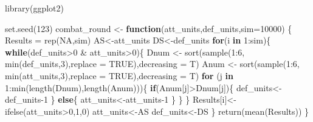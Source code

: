 \documentclass[
]{article}
\newenvironment{Shaded}{\begin{snugshade}}{\end{snugshade}}
\newcommand{\AttributeTok}[1]{\textcolor[rgb]{0.77,0.63,0.00}{#1}}
\newcommand{\ConstantTok}[1]{\textcolor[rgb]{0.00,0.00,0.00}{#1}}
\newcommand{\ControlFlowTok}[1]{\textcolor[rgb]{0.13,0.29,0.53}{\textbf{#1}}}
\newcommand{\DecValTok}[1]{\textcolor[rgb]{0.00,0.00,0.81}{#1}}
\newcommand{\FunctionTok}[1]{\textcolor[rgb]{0.00,0.00,0.00}{#1}}
\newcommand{\NormalTok}[1]{#1}
\newcommand{\OtherTok}[1]{\textcolor[rgb]{0.56,0.35,0.01}{#1}}
\newcommand{\SpecialCharTok}[1]{\textcolor[rgb]{0.00,0.00,0.00}{#1}}
\begin{document}
\begin{Shaded}
\begin{Highlighting}[]
\FunctionTok{library}\NormalTok{(ggplot2)}

\FunctionTok{set.seed}\NormalTok{(}\DecValTok{123}\NormalTok{)}
\NormalTok{combat\_round }\OtherTok{\textless{}{-}} \ControlFlowTok{function}\NormalTok{(att\_units,def\_units,}\AttributeTok{sim=}\DecValTok{10000}\NormalTok{) \{}
\NormalTok{  Results }\OtherTok{=} \FunctionTok{rep}\NormalTok{(}\ConstantTok{NA}\NormalTok{,sim)}
\NormalTok{  AS}\OtherTok{\textless{}{-}}\NormalTok{att\_units}
\NormalTok{  DS}\OtherTok{\textless{}{-}}\NormalTok{def\_units}
  \ControlFlowTok{for}\NormalTok{(i }\ControlFlowTok{in} \DecValTok{1}\SpecialCharTok{:}\NormalTok{sim)\{}
    \ControlFlowTok{while}\NormalTok{(def\_units}\SpecialCharTok{\textgreater{}}\DecValTok{0} \SpecialCharTok{\&}\NormalTok{ att\_units}\SpecialCharTok{\textgreater{}}\DecValTok{0}\NormalTok{)\{}
\NormalTok{      Dnum }\OtherTok{\textless{}{-}} \FunctionTok{sort}\NormalTok{(}\FunctionTok{sample}\NormalTok{(}\DecValTok{1}\SpecialCharTok{:}\DecValTok{6}\NormalTok{, }\FunctionTok{min}\NormalTok{(def\_units,}\DecValTok{3}\NormalTok{),}\AttributeTok{replace =} \ConstantTok{TRUE}\NormalTok{),}\AttributeTok{decreasing =}\NormalTok{ T)}
\NormalTok{      Anum }\OtherTok{\textless{}{-}} \FunctionTok{sort}\NormalTok{(}\FunctionTok{sample}\NormalTok{(}\DecValTok{1}\SpecialCharTok{:}\DecValTok{6}\NormalTok{, }\FunctionTok{min}\NormalTok{(att\_units,}\DecValTok{3}\NormalTok{),}\AttributeTok{replace =} \ConstantTok{TRUE}\NormalTok{),}\AttributeTok{decreasing =}\NormalTok{ T)}
      \ControlFlowTok{for}\NormalTok{ (j }\ControlFlowTok{in} \DecValTok{1}\SpecialCharTok{:}\FunctionTok{min}\NormalTok{(}\FunctionTok{length}\NormalTok{(Dnum),}\FunctionTok{length}\NormalTok{(Anum)))\{}
        \ControlFlowTok{if}\NormalTok{(Anum[j]}\SpecialCharTok{\textgreater{}}\NormalTok{Dnum[j])\{}
\NormalTok{          def\_units}\OtherTok{\textless{}{-}}\NormalTok{def\_units}\DecValTok{{-}1}
\NormalTok{        \}}
        \ControlFlowTok{else}\NormalTok{\{}
\NormalTok{          att\_units}\OtherTok{\textless{}{-}}\NormalTok{att\_units}\DecValTok{{-}1}
\NormalTok{        \}}
\NormalTok{      \}}
\NormalTok{    \}}
\NormalTok{    Results[i]}\OtherTok{\textless{}{-}} \FunctionTok{ifelse}\NormalTok{(att\_units}\SpecialCharTok{\textgreater{}}\DecValTok{0}\NormalTok{,}\DecValTok{1}\NormalTok{,}\DecValTok{0}\NormalTok{)}
\NormalTok{    att\_units}\OtherTok{\textless{}{-}}\NormalTok{AS}
\NormalTok{    def\_units}\OtherTok{\textless{}{-}}\NormalTok{DS}
\NormalTok{  \}}
  \FunctionTok{return}\NormalTok{(}\FunctionTok{mean}\NormalTok{(Results))}
\NormalTok{\}}


\end{Highlighting}
\end{Shaded}
\end{document}
